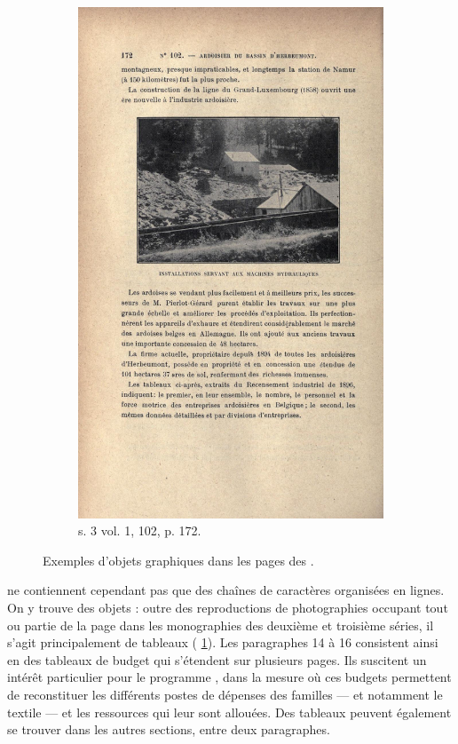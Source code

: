 \begin{figure}
\begin{subfigure}[t]{0.4\textwidth}
     \includegraphics[width=0.8\linewidth]{img/img_s3t1_m102_p172.png}
     \caption{s. 3 vol. 1, \no{} 102, p. 172.}
    \end{subfigure}
    \hspace{5pt}
    \caption[Exemples d'objets graphiques]{Exemples d'objets graphiques dans les pages des \odm{}.}
    \label{fig:ex_figures}
\end{figure}

\lodm{} ne contiennent cependant pas que des chaînes de caractères organisées en lignes. On y trouve des \og objets \fg{} : outre des reproductions de photographies occupant tout ou partie de la page dans les monographies des deuxième et troisième séries, il s'agit principalement de tableaux (\fig{} \ref{fig:ex_figures}). Les paragraphes 14 à 16 consistent ainsi en des tableaux de budget qui s'étendent sur plusieurs pages. Ils suscitent un intérêt particulier pour le programme \timeus{}, dans la mesure où ces budgets permettent de reconstituer les différents postes de dépenses des familles --- et notamment le textile --- et les ressources qui leur sont allouées. Des tableaux peuvent également se trouver dans les autres sections, entre deux paragraphes.

